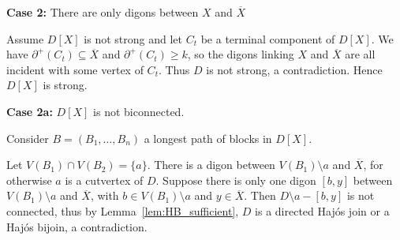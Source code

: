 
    \medskip 
    
    \noindent\textbf{Case 2:} There are only digons between $X$ and $\overline{X}$ %


    
     Assume $D[X]$ is not strong and let $C_t$ be a terminal component of $D[X]$. We have  $\partial^+(C_t) \subseteq \overline X$ and $\partial^+(C_t) \geq k$, so the digons linking $X$ and $\overline{X}$ are all incident with some vertex of $C_t$. Thus $D$ is not strong, a contradiction. Hence $D[X]$ is strong.

    \noindent\textbf{Case 2a:} $D[X]$ is not biconnected.
    
    Consider $B = (B_1, \dots, B_n)$ a longest path of blocks in $D[X]$.
    
    Let $V(B_1) \cap V(B_{2}) = \{a\}$. 
    There is a digon between $V(B_1) \setminus a$ and $\overline{X}$, for otherwise $a$ is a cutvertex of $D$. 
    Suppose there is only one digon $[b,y]$ between $V(B_1) \setminus a$ and $\overline{X}$, with $b \in V(B_1) \setminus a$ and $y \in \overline{X}$. 
    Then $D \setminus a - [b,y]$ is not connected, thus by Lemma~\ref{lem:HB_sufficient}, $D$ is a directed Haj\'os join or a Haj\'os bijoin, a contradiction.
    
        
